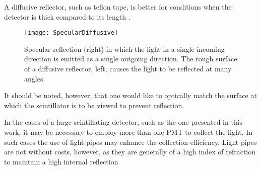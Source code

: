A diffusive reflector, such as teflon tape, is better for conditions when the detector is thick compared to its length \cite{knoll_radiation_2009}.
\begin{figure}
	\centering
	\texttt{[image: SpecularDiffusive]}
	\caption[Specular and Diffusive Reflection]{Specular reflection (right) in which the light in a single incoming direction is emitted as a single outgoing direction. The rough surface of a diffusive reflector, left, causes the light to be reflected at many angles.}
	\label{fig:SpecularDiffusive} 
\end{figure}
It should be noted, however, that one would like to optically match the surface at which the scintillator is to be viewed to prevent reflection.

In the cases of a large scintillating detector, such as the one presented in this work, it  may be necessary to employ more than one PMT to collect the light.
In such cases the use of light pipes may enhance the collection efficiency. 
Light pipes are not without costs, however, as they are generally of a high index of refraction to maintain a high internal reflection
